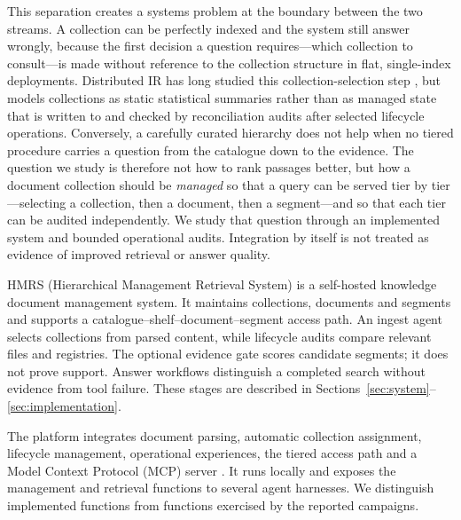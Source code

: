 This separation creates a systems problem at the boundary between the two
streams. A collection can be perfectly indexed and the system still answer wrongly,
because the first decision a question requires---which collection to
consult---is made without reference to the collection structure in flat,
single-index deployments.
Distributed IR has long studied this collection-selection step
\cite{callan1995searching,si2003redde}, but models collections as static
statistical summaries rather than as managed state that is written to and
checked by reconciliation audits after selected lifecycle operations.
Conversely, a carefully curated hierarchy does not help when no tiered
procedure carries a question from the catalogue down to the evidence. The
question we study is therefore not how to rank passages better, but how a
document collection should be \emph{managed} so that a query can be served
tier by tier---selecting a collection, then a document, then a segment---and
so that each tier can be audited independently. We study that question through
an implemented system and bounded operational audits. Integration by itself is
not treated as evidence of improved retrieval or answer quality.

HMRS (Hierarchical Management Retrieval System) is a self-hosted
knowledge document management system. It maintains collections, documents and
segments and supports a catalogue--shelf--document--segment access path.
An ingest agent selects collections from parsed content, while lifecycle audits
compare relevant files and registries. The optional evidence gate scores
candidate segments; it does not prove support. Answer workflows distinguish a
completed search without evidence from tool failure. These stages are described
in Sections~\ref{sec:system}--\ref{sec:implementation}.

The platform integrates document parsing, automatic collection assignment,
lifecycle management, operational experiences, the tiered access path and a
Model Context Protocol (MCP) server \cite{mcp}. It
runs locally and exposes the management and retrieval functions to several
agent harnesses. We distinguish implemented functions from functions exercised
by the reported campaigns.

